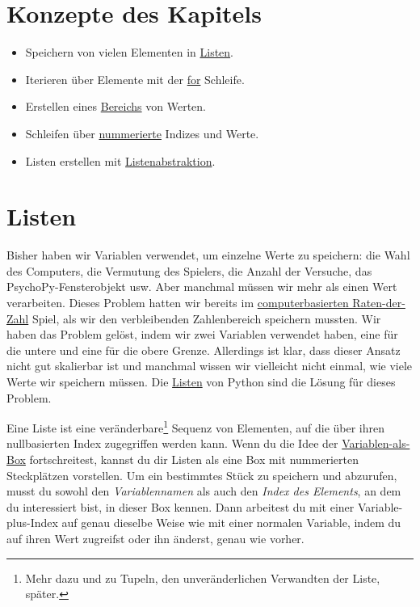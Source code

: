 \documentclass[
]{book}
\providecommand{\tightlist}{%
  \setlength{\itemsep}{0pt}\setlength{\parskip}{0pt}}
\begin{document}
\hypertarget{konzepte-des-kapitels-3}{%
\section{Konzepte des Kapitels}\label{konzepte-des-kapitels-3}}

\begin{itemize}
\tightlist
\item
  Speichern von vielen Elementen in \protect\hyperlink{lists}{Listen}.
\item
  Iterieren über Elemente mit der \protect\hyperlink{for-loop}{for} Schleife.
\item
  Erstellen eines \protect\hyperlink{range}{Bereichs} von Werten.
\item
  Schleifen über \protect\hyperlink{enumerate}{nummerierte} Indizes und Werte.
\item
  Listen erstellen mit \protect\hyperlink{list-comprehension}{Listenabstraktion}.
\end{itemize}

\hypertarget{lists}{%
\section{Listen}\label{lists}}

Bisher haben wir Variablen verwendet, um einzelne Werte zu speichern: die Wahl des Computers, die Vermutung des Spielers, die Anzahl der Versuche, das PsychoPy-Fensterobjekt usw. Aber manchmal müssen wir mehr als einen Wert verarbeiten. Dieses Problem hatten wir bereits im \protect\hyperlink{guess-the-number-ai}{computerbasierten Raten-der-Zahl} Spiel, als wir den verbleibenden Zahlenbereich speichern mussten. Wir haben das Problem gelöst, indem wir zwei Variablen verwendet haben, eine für die untere und eine für die obere Grenze. Allerdings ist klar, dass dieser Ansatz nicht gut skalierbar ist und manchmal wissen wir vielleicht nicht einmal, wie viele Werte wir speichern müssen. Die \href{https://docs.python.org/3/library/stdtypes.html\#lists}{Listen} von Python sind die Lösung für dieses Problem.

Eine Liste ist eine veränderbare\footnote{Mehr dazu und zu Tupeln, den unveränderlichen Verwandten der Liste, später.} Sequenz von Elementen, auf die über ihren nullbasierten Index zugegriffen werden kann. Wenn du die Idee der \protect\hyperlink{variables}{Variablen-als-Box} fortschreitest, kannst du dir Listen als eine Box mit nummerierten Steckplätzen vorstellen. Um ein bestimmtes Stück zu speichern und abzurufen, musst du sowohl den \emph{Variablennamen} als auch den \emph{Index des Elements}, an dem du interessiert bist, in dieser Box kennen. Dann arbeitest du mit einer Variable-plus-Index auf genau dieselbe Weise wie mit einer normalen Variable, indem du auf ihren Wert zugreifst oder ihn änderst, genau wie vorher.
\end{document}
